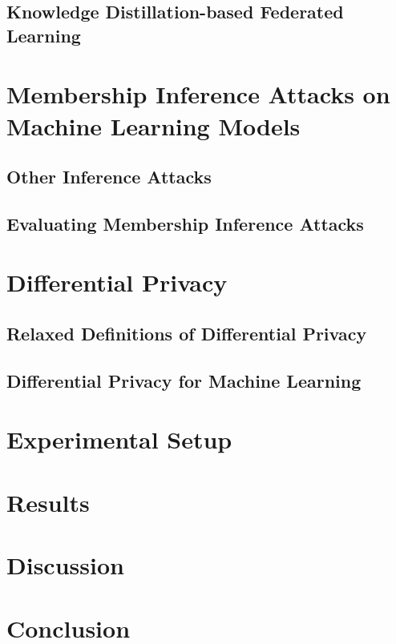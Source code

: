 \subsection{Knowledge Distillation-based Federated Learning}




\section{Membership Inference Attacks on Machine Learning Models}
\label{sec:mia}

\subsection{Other Inference Attacks}
\subsection{Evaluating Membership Inference Attacks}

\section{Differential Privacy}
\label{sec:dp}

\subsection{Relaxed Definitions of Differential Privacy}

\subsection{Differential Privacy for Machine Learning}


\section{Experimental Setup}
\section{Results}
\section{Discussion}
\section{Conclusion}
